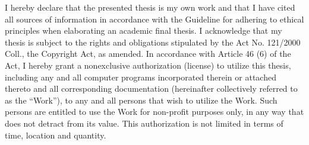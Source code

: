 \documentclass[english,bachelor,unicode]{ctufit-thesis}
\theoremstyle{plain}
\theoremstyle{definition}
\theoremstyle{remark}
\numberwithin{theorem}{chapter}
\begin{document}
\begin{declarationpage}
I hereby declare that the presented thesis is my own work and that I have cited all
sources of information in accordance with the Guideline for adhering to ethical
principles when elaborating an academic final thesis.
I acknowledge that my thesis is subject to the rights and obligations stipulated by the
Act No. 121/2000 Coll., the Copyright Act, as amended. In accordance with Article 46 (6)
of the Act, I hereby grant a nonexclusive authorization (license) to utilize this thesis,
including any and all computer programs incorporated therein or attached thereto and
all corresponding documentation (hereinafter collectively referred to as the “Work”), to
any and all persons that wish to utilize the Work. Such persons are entitled to use the
Work for non-profit purposes only, in any way that does not detract from its value. This
authorization is not limited in terms of time, location and quantity.
\end{declarationpage}

\printabstractpage %

\printglossary[type=\acronymtype,title={List of Abbreviations}]

\mainmatter\mainmatterinit %


\glsresetall
{}










\appendix\appendixinit %


\backmatter %

\printbibliography %

\end{document}
